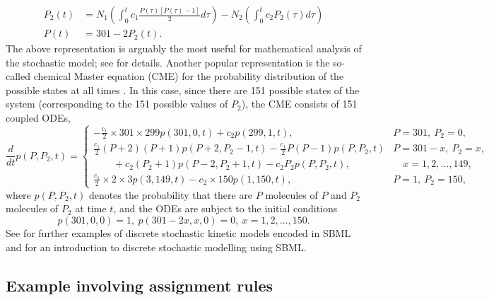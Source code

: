 \begin{align*}
P_2(t) &= N_1\left(\int_0^t
c_1\frac{P(\tau)[P(\tau)-1]}{2}d\tau\right) - N_2\left(\int_0^t
c_2 P_2(\tau)d\tau\right) \\
P(t) &= 301 - 2P_2(t).
\end{align*}
The above representation is arguably the most useful for
mathematical analysis of the stochastic model; see \cite{ball:2006} for
details. Another popular representation is the so-called chemical
Master equation (CME) for the probability distribution of the possible
states at all times \citep{gillespie:1992}. In this case, since there are
151 possible states of the system (corresponding to the 151
possible values of $P_2$), the CME consists of 151 coupled
ODEs,
\[
\frac{d}{dt}p(P,P_2,t) =
\left\{
\begin{array}{ll}
\displaystyle-\frac{c_1}{2}\times 301\times 299p(301,0,t)+c_2p(299,1,t),
&P=301,\ P_2=0,\\[8pt]
\displaystyle\frac{c_1}{2}(P+2)(P+1)p(P+2,P_2-1,t)-\frac{c_1}{2}P(P-1)p(P,P_2,t)&P=301-x,\ P_2=x,\\[5pt]
\qquad+c_2(P_2+1)p(P-2,P_2+1,t)-c_2P_2p(P,P_2,t),
&\quad x=1,2,\ldots,149,\\[8pt]
\displaystyle\frac{c_1}{2}\times 2\times 3p(3,149,t)-c_2\times 150p(1,150,t),
&P=1,\ P_2=150,
\end{array}
\right.
\]
where $p(P,P_2,t)$ denotes the probability that there are $P$
molecules of $P$ and $P_2$ molecules of $P_2$ at time $t$, and the
ODEs are subject to the initial conditions
\[
p(301,0,0)=1,\ p(301-2x,x,0)=0,\ x=1,2,\ldots,150.
\]
See \cite{evans:2008} for further examples of discrete stochastic
kinetic models encoded in SBML and \cite{wilkinson_2006} for an
introduction to discrete stochastic modelling using SBML.



\subsection{Example involving assignment rules}
\label{apdx:rules-eg}

